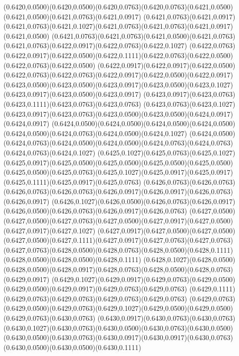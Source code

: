 (0.6420,0.0500)(0.6420,0.0500)(0.6420,0.0763)(0.6420,0.0763)(0.6421,0.0500)(0.6421,0.0500)(0.6421,0.0763)(0.6421,0.0917)
(0.6421,0.0763)(0.6421,0.0917)(0.6421,0.0763)(0.6421,0.1027)(0.6421,0.0763)(0.6421,0.0763)(0.6421,0.0917)(0.6421,0.0500)
(0.6421,0.0763)(0.6421,0.0763)(0.6421,0.0500)(0.6421,0.0763)(0.6421,0.0763)(0.6422,0.0917)(0.6422,0.0763)(0.6422,0.1027)
(0.6422,0.0763)(0.6422,0.0917)(0.6422,0.0500)(0.6422,0.1111)(0.6422,0.0763)(0.6422,0.0500)(0.6422,0.0763)(0.6422,0.0500)
(0.6422,0.0917)(0.6422,0.0917)(0.6422,0.0500)(0.6422,0.0763)(0.6422,0.0763)(0.6422,0.0917)(0.6422,0.0500)(0.6422,0.0917)
(0.6423,0.0500)(0.6423,0.0500)(0.6423,0.0917)(0.6423,0.0500)(0.6423,0.1027)(0.6423,0.0917)(0.6423,0.0500)(0.6423,0.0917)
(0.6423,0.0917)(0.6423,0.0763)(0.6423,0.1111)(0.6423,0.0763)(0.6423,0.0763)
\PST@Solid(0.6423,0.0763)(0.6423,0.1027)(0.6423,0.0917)(0.6423,0.0763)(0.6423,0.0500)(0.6423,0.0500)(0.6424,0.0917)(0.6424,0.0917)
(0.6424,0.0500)(0.6424,0.0500)(0.6424,0.0500)(0.6424,0.0500)(0.6424,0.0500)(0.6424,0.0763)(0.6424,0.0500)(0.6424,0.1027)
(0.6424,0.0500)(0.6424,0.0763)(0.6424,0.0500)(0.6424,0.0500)(0.6424,0.0763)(0.6424,0.0763)(0.6424,0.0763)(0.6424,0.1027)
(0.6425,0.1027)(0.6425,0.0763)(0.6425,0.1027)(0.6425,0.0917)(0.6425,0.0500)(0.6425,0.0500)(0.6425,0.0500)(0.6425,0.0500)
(0.6425,0.0500)(0.6425,0.0763)(0.6425,0.1027)(0.6425,0.0917)(0.6425,0.0917)(0.6425,0.1111)(0.6425,0.0917)(0.6425,0.0763)
(0.6426,0.0763)(0.6426,0.0763)(0.6426,0.0763)(0.6426,0.0763)(0.6426,0.0917)(0.6426,0.0917)(0.6426,0.0763)(0.6426,0.0917)
(0.6426,0.1027)(0.6426,0.0500)(0.6426,0.0763)(0.6426,0.0917)(0.6426,0.0500)(0.6426,0.0763)(0.6426,0.0917)(0.6426,0.0763)
(0.6427,0.0500)(0.6427,0.0500)(0.6427,0.0763)(0.6427,0.0500)(0.6427,0.0917)(0.6427,0.0500)(0.6427,0.0917)(0.6427,0.1027)
(0.6427,0.0917)(0.6427,0.0500)(0.6427,0.0500)(0.6427,0.0500)(0.6427,0.1111)(0.6427,0.0917)(0.6427,0.0763)(0.6427,0.0763)
(0.6427,0.0763)(0.6428,0.0500)(0.6428,0.0763)(0.6428,0.0500)(0.6428,0.1111)(0.6428,0.0500)(0.6428,0.0500)(0.6428,0.1111)
(0.6428,0.1027)(0.6428,0.0500)(0.6428,0.0500)(0.6428,0.0917)(0.6428,0.0763)(0.6428,0.0500)(0.6428,0.0763)(0.6429,0.0917)
(0.6429,0.1027)(0.6429,0.0917)(0.6429,0.0763)(0.6429,0.0500)(0.6429,0.0500)(0.6429,0.0917)(0.6429,0.0763)(0.6429,0.0763)
(0.6429,0.1111)(0.6429,0.0763)(0.6429,0.0763)(0.6429,0.0763)(0.6429,0.0763)
\PST@Solid(0.6429,0.0763)(0.6429,0.0500)(0.6429,0.0763)(0.6429,0.1027)(0.6429,0.0500)(0.6429,0.0500)(0.6429,0.0763)(0.6430,0.0763)
(0.6430,0.0917)(0.6430,0.0763)(0.6430,0.0763)(0.6430,0.1027)(0.6430,0.0763)(0.6430,0.0500)(0.6430,0.0763)(0.6430,0.0500)
(0.6430,0.0500)(0.6430,0.0763)(0.6430,0.0917)(0.6430,0.0917)(0.6430,0.0763)(0.6430,0.0500)(0.6430,0.0500)(0.6430,0.1111)
